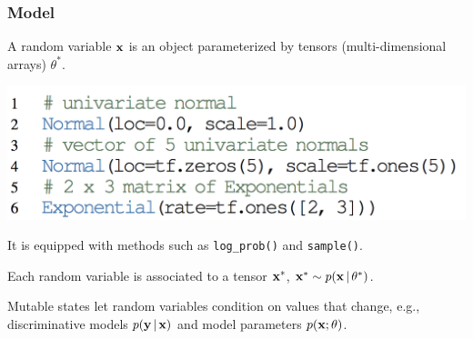 \documentclass[10pt,
               xcolor={usenames,dvipsnames},
               hyperref={colorlinks,linktoc=all,citecolor=Plum,linkcolor=MidnightBlue,urlcolor=MidnightBlue},noamssymb]{beamer}
\begin{document}





\begin{frame}
\frametitle{Model}
A random variable $\boldsymbol{\mathbf{x}}$ is an object parameterized by tensors
(multi-dimensional arrays) $\theta^*$.

\vspace{-1.0ex}
\includegraphics[height=0.20\textwidth]{img/random_variables.png}

It is equipped with methods such as \texttt{log\_prob()} and \texttt{sample()}.

Each random variable is associated to a tensor $\boldsymbol{\mathbf{x}}^*$, $\boldsymbol{\mathbf{x}}^*\sim p(\boldsymbol{\mathbf{x}}\,|\,\theta^*)$.

Mutable states let random variables condition on values that
change, e.g., discriminative models $p(\boldsymbol{\mathbf{y}}\,|\,\boldsymbol{\mathbf{x}})$ and model
parameters $p(\boldsymbol{\mathbf{x}}; \theta)$.
\end{frame}
\end{document}
